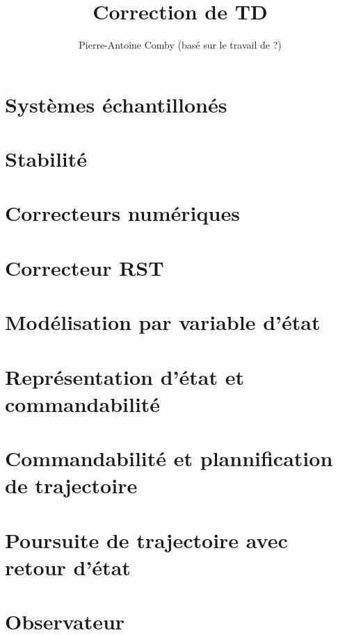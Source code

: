 \documentclass{../../td}
\title{Correction de TD}
\author{Pierre-Antoine Comby (basé sur le travail de ?)}
\begin{document}
\maketitle
\tableofcontents
\section{Systèmes échantillonés}

\section{Stabilité}

\section{Correcteurs numériques}

\section{Correcteur RST}

\section{Modélisation par variable d'état}

\section{Représentation d'état et commandabilité}

\section{Commandabilité et plannification de trajectoire}

\section{Poursuite de trajectoire avec retour d'état}

\section{Observateur}

\end{document}
